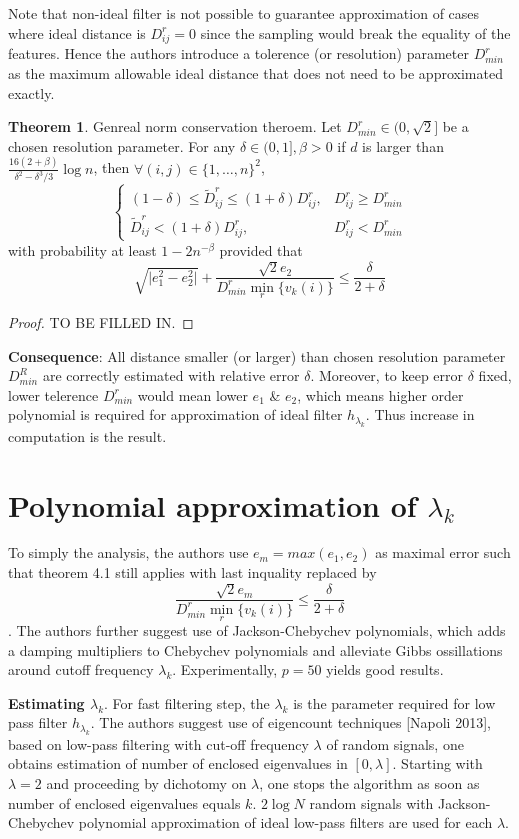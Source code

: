 \documentclass[10pt,a4paper,twoside]{report}
\theoremstyle{definition}
\newtheorem{theorem}{Theorem}
\newcommand{\abs}[1]{\lvert {#1} \rvert}
\begin{document}
	Note that non-ideal filter is not possible to guarantee approximation of cases where ideal distance is $D_{ij}^r=0$ since the sampling would break the equality of the features. Hence the authors introduce a tolerence (or resolution) parameter $D_{min}^r$ as the maximum allowable ideal distance that does not need to be approximated exactly. 

	\begin{theorem}{Genreal norm conservation theroem}. Let $D_{min}^r \in (0,\sqrt{2}]$ be a chosen resolution parameter. 
		For any $\delta \in (0,1], \beta>0$ if $d$ is larger than $\frac{16(2+\beta)}{\delta^2-\delta^3/3}\log n$, then $\forall (i,j)\in \{1,\dots,n\}^2$, 
		$$\begin{cases}(1 -\delta) \le \tilde D_{ij}^r \le (1 +\delta)D_{ij}^r, &D_{ij}^r \ge D_{min}^r \\ \tilde{D}_{ij}^r < (1+\delta)D_{ij}^r, &D_{ij}^r < D_{min}^r\end{cases}$$
		with probability at least $1-2n^{-\beta}$ provided that $$ \sqrt{\abs{e_1^2 - e_2^2}} + \frac{\sqrt{2}e_2}{D_{min}^r \min_r\{v_k(i)\}} \le \frac{\delta}{2+\delta}$$		
	\end{theorem}

	\begin{proof}
		TO BE FILLED IN.
	\end{proof}

	\textbf{Consequence}: All distance smaller (or larger) than chosen resolution parameter $D_{min}^R$ are correctly estimated with relative error $\delta$. Moreover, to keep error $\delta$ fixed, lower telerence $D_{min}^r$ would mean lower $e_1$ \& $e_2$, which means higher order polynomial is required for approximation of ideal filter $h_{\lambda_k}$. Thus increase in computation is the result. 

	\section{Polynomial approximation of $\lambda_k$}
	To simply the analysis, the authors use $e_m = max(e_1, e_2)$ as maximal error such that theorem 4.1 still applies with last inquality replaced by $$ \frac{\sqrt{2}e_m}{D_{min}^r \min_r\{v_k(i)\}} \le \frac{\delta}{2+\delta} $$. 
	The authors further suggest use of Jackson-Chebychev polynomials, which adds a damping multipliers to Chebychev polynomials and alleviate Gibbs ossillations around cutoff frequency $\lambda_k$. Experimentally, $p=50$ yields good results. 
	
	\textbf{Estimating $\lambda_k$}. For fast filtering step, the $\lambda_k$ is the parameter required for low pass filter $h_{\lambda_k}$. The authors suggest use of eigencount techniques [Napoli 2013], based on low-pass filtering with cut-off frequency $\lambda$ of random signals, one obtains estimation of number of enclosed eigenvalues in $[0,\lambda]$. Starting with $\lambda=2$ and proceeding by dichotomy on $\lambda$, one stops the algorithm as soon as number of enclosed eigenvalues equals $k$. $2\log N$ random signals with Jackson-Chebychev polynomial approximation of ideal low-pass filters are used for each $\lambda$. 
\end{document}
